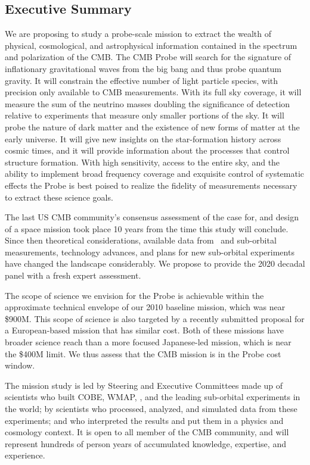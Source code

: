 
\subsection{Executive Summary}
\label{sec:executive}

\vspace{-0.05in}

We are proposing to study a probe-scale mission to extract the wealth 
of physical, cosmological, and astrophysical information contained in the spectrum and polarization of the \ac{CMB}. 
The CMB Probe will search for the signature of inflationary gravitational waves from the big bang 
and thus probe quantum gravity. It will constrain the effective 
number of light particle species, with precision only available to CMB measurements. 
With its full sky coverage, it will measure the sum of the neutrino masses doubling the significance of detection 
relative to experiments that measure only smaller portions of the sky. It will probe 
the nature of dark matter and the existence of new forms of matter at the early universe.  It will 
give new insights on the star-formation history across cosmic times, and it will provide information about 
the processes that control structure formation. 
With high sensitivity, access to the entire sky, and the ability to implement broad frequency coverage 
and exquisite control of systematic effects the Probe is best poised to realize the fidelity of measurements 
necessary to extract these science goals. 

The last US CMB community's consensus assessment of the case for, 
and design of a space mission took place 10 years from the time this study will conclude. 
Since then theoretical considerations, available data from \planck\ and sub-orbital measurements, technology advances, 
and plans for new sub-orbital experiments have changed the landscape considerably. 
We propose to provide the 2020 decadal panel with a fresh expert assessment. 

The scope of science we envision for the Probe is achievable within the approximate technical 
envelope of our 2010 baseline mission, which was near \$900M. This scope of science 
is also targeted by a recently submitted proposal for a European-based mission that has 
similar cost.  Both of these missions have broader science reach than a 
more focused Japanese-led mission, which 
is near the \$400M limit. We thus assess that the CMB mission is in the Probe cost window. 

The mission study is led by Steering 
and Executive Committees made up of scientists who built COBE, WMAP, \planck , and the 
leading sub-orbital experiments in the world; by scientists who processed, analyzed, and simulated data from 
these experiments; and who interpreted the results and put them in a physics and cosmology context. 
It is open to all member of the CMB community, and will represent hundreds of person years of 
accumulated knowledge, expertise, and experience. 


